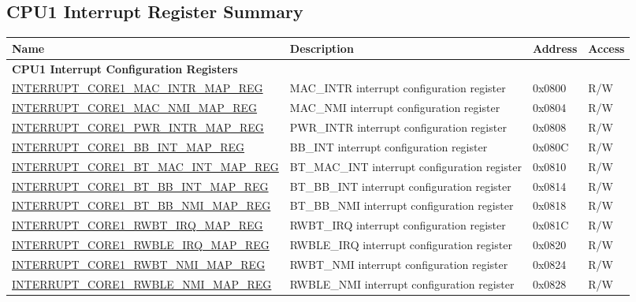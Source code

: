 \begin{landscape}
\chapter{CPU1 Interrupt Register Summary}\label{CPU1RegisterSummary}
\begin{longtable}{ | p{10cm} | p{10.2cm} | p{1.3cm} | p{1cm} | }
\hline\rowcolor{lightgray}
Name & Description &  Address & Access \\ \hline
\endhead
\multicolumn{4}{|l|}{\textbf{CPU1 Interrupt Configuration Registers}} \\ \hline
\hyperref[regdesc:INTERRUPTCORE1MACINTRMAPREG]{INTERRUPT\_CORE1\_MAC\_INTR\_MAP\_REG} & MAC\_INTR interrupt configuration register & 0x0800 & R/W \\ \hline
\hyperref[regdesc:INTERRUPTCORE1MACNMIMAPREG]{INTERRUPT\_CORE1\_MAC\_NMI\_MAP\_REG} & MAC\_NMI interrupt configuration register & 0x0804 & R/W \\ \hline
\hyperref[regdesc:INTERRUPTCORE1PWRINTRMAPREG]{INTERRUPT\_CORE1\_PWR\_INTR\_MAP\_REG} & PWR\_INTR interrupt configuration register & 0x0808 & R/W \\ \hline
\hyperref[regdesc:INTERRUPTCORE1BBINTMAPREG]{INTERRUPT\_CORE1\_BB\_INT\_MAP\_REG} & BB\_INT interrupt configuration register & 0x080C & R/W \\ \hline
\hyperref[regdesc:INTERRUPTCORE1BTMACINTMAPREG]{INTERRUPT\_CORE1\_BT\_MAC\_INT\_MAP\_REG} & BT\_MAC\_INT interrupt configuration register & 0x0810 & R/W \\ \hline
\hyperref[regdesc:INTERRUPTCORE1BTBBINTMAPREG]{INTERRUPT\_CORE1\_BT\_BB\_INT\_MAP\_REG} & BT\_BB\_INT interrupt configuration register & 0x0814 & R/W \\ \hline
\hyperref[regdesc:INTERRUPTCORE1BTBBNMIMAPREG]{INTERRUPT\_CORE1\_BT\_BB\_NMI\_MAP\_REG} & BT\_BB\_NMI interrupt configuration register & 0x0818 & R/W \\ \hline
\hyperref[regdesc:INTERRUPTCORE1RWBTIRQMAPREG]{INTERRUPT\_CORE1\_RWBT\_IRQ\_MAP\_REG} & RWBT\_IRQ interrupt configuration register & 0x081C & R/W \\ \hline
\hyperref[regdesc:INTERRUPTCORE1RWBLEIRQMAPREG]{INTERRUPT\_CORE1\_RWBLE\_IRQ\_MAP\_REG} & RWBLE\_IRQ interrupt configuration register & 0x0820 & R/W \\ \hline
\hyperref[regdesc:INTERRUPTCORE1RWBTNMIMAPREG]{INTERRUPT\_CORE1\_RWBT\_NMI\_MAP\_REG} & RWBT\_NMI interrupt configuration register & 0x0824 & R/W \\ \hline
\hyperref[regdesc:INTERRUPTCORE1RWBLENMIMAPREG]{INTERRUPT\_CORE1\_RWBLE\_NMI\_MAP\_REG} & RWBLE\_NMI interrupt configuration register & 0x0828 & R/W \\ \hline

\end{longtable}
\end{landscape}
